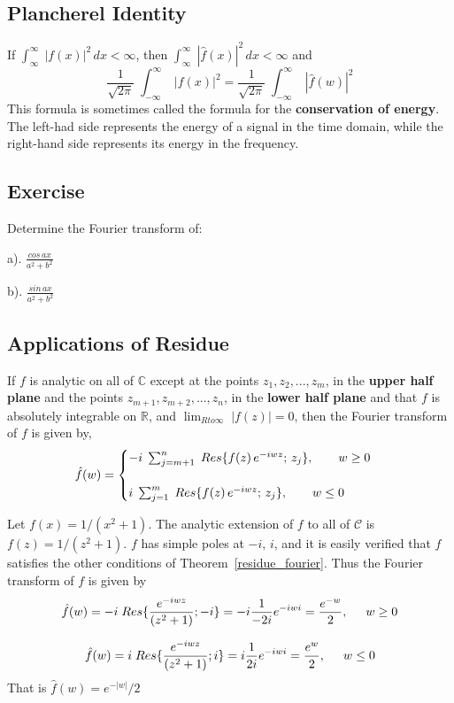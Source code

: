 \message{ !name(ch3_aima331.tex)}\documentclass[aima331_lecturenotes_ku.tex]{subfiles}
\begin{document}
 \subsection{Plancherel Identity}
 If $\displaystyle \int_{\infty}^{\infty} \; |f(x)|^2\, dx < \infty$, then $\displaystyle \int_{\infty}^{\infty} \; |\hat{f}(x)|^2\, dx < \infty$ and
 $$\frac{1}{\sqrt{2\pi}} \; \int_{-\infty}^{\infty} \; |f(x)|^2 = \frac{1}{\sqrt{2\pi}} \; \int_{-\infty}^{\infty} \; |\hat{f}(w)|^2$$
 This formula is sometimes called the formula for the \textbf{conservation of energy}. The left-had side represents the energy of a signal in the time domain, while the right-hand side represents its energy in the frequency.
 \subsection{Exercise}
 Determine the Fourier transform of:
 \begin{multicols}{2}
   a). $\displaystyle \frac{cos\,ax}{a^2+b^2}$
   \columnbreak

   b). $\displaystyle \frac{sin\,ax}{a^2+b^2}$
 \end{multicols}

 \subsection{Applications of Residue}
 \begin{theorem}
   If $f$ is analytic on all of $\mathbb{C}$ except at the points $z_1, z_2, ..., z_m$, in the \textbf{upper half plane} and the points $z_{m+1}, z_{m+2}, ..., z_n$, in the \textbf{lower half plane} and that $f$ is absolutely integrable on $\mathbb{R}$, and $\displaystyle \lim_{R
     to \infty} \; |f(z)|=0$, then the Fourier transform of $f$ is given by,
   \begin{equation}
     \label{residue_fourier}
     \hat{f}(w)=
     \begin{cases}
       -i \; \sum_{j=m+1}^n\; Res\{f(z)\, e^{-iwz};\,z_j\}, \hspace{7mm} w \geq 0 \\[5mm]
       i \; \sum_{j=1}^m\; Res\{f(z)\, e^{-iwz};\,z_j\}, \hspace{7mm} w \leq 0
     \end{cases}
   \end{equation}
 \end{theorem}
 \begin{example}
   Let $f(x)= 1 / (x^2 +1)$. The analytic extension of $f$ to all of $\mathcal{C}$ is $f(z) = 1 / (z^2 +1)$. $f$ has simple poles at $-i,\, i$, and it is easily verified that $f$ satisfies the other conditions of Theorem~\ref{residue_fourier}. Thus the Fourier transform of $f$ is given by
   $$\hat{f}(w) = -i \; Res\{\frac{e^{-iwz}}{(z^2 +1)} ; -i\}= -i \frac{1}{-2i}e^{-iwi} = \frac{e^{-w}}{2}, \hspace{5mm} w\geq 0$$

   $$\hat{f}(w) = i \; Res\{\frac{e^{-iwz}}{(z^2 +1)} ; i\}= i \frac{1}{2i}e^{-iwi} = \frac{e^{w}}{2}, \hspace{5mm} w\leq 0$$
   That is $\hat{f}(w) = e^{-|w|} /2$
 \end{example}
\end{document}

